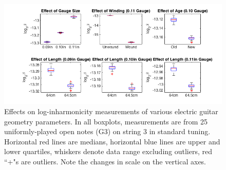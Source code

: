 \documentclass[12pt]{cmuthesis}
\begin{document}
\begin{figure}[!htbp] 
\centering
\includegraphics[scale=0.70]{eg-params}
\caption{Effects on log-inharmonicity measurements of various electric guitar geometry parameters. In all boxplots, measurements are from 25 uniformly-played open notes (G3) on string 3 in standard tuning. Horizontal red lines are medians, horizontal blue lines are upper and lower quartiles, whiskers denote data range excluding outliers, red ``+"s are outliers. Note the changes in scale on the vertical axes.}
\label{fig:eg-params}
\end{figure} 

\end{document}
